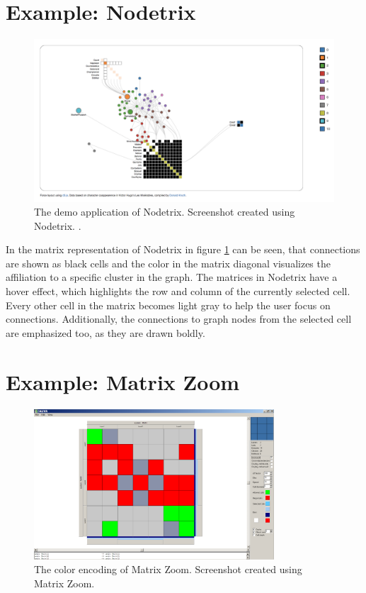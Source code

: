 \section{Example: Nodetrix}


\begin{figure}[H]
\includegraphics[width=\textwidth]{images/nodetrix_cell}
\caption{The demo application of Nodetrix. Screenshot created using Nodetrix. \citep[1302-1309]{henry-nodetrix-2007}.\label{fig:cell_nodetrix}}
\end{figure}



In the matrix representation of Nodetrix in figure \ref{fig:cell_nodetrix} can be seen, that connections are shown as black cells and the color in the matrix diagonal visualizes the affiliation to a specific cluster in the graph. The matrices in Nodetrix have a hover effect, which highlights the row and column of the currently selected cell. Every other cell in the matrix becomes light gray to help the user focus on connections. Additionally, the connections to graph nodes from the selected cell are emphasized too, as they are drawn boldly. \citep[1302-1309]{henry-nodetrix-2007}

\section{Example: Matrix Zoom}

\begin{figure}[H]
\centering
\includegraphics[width=0.8\textwidth]{images/matrixzoom_cell}
\caption{The color encoding of Matrix Zoom. Screenshot created using Matrix Zoom. \citep[227--232]{ham-ivis-2003}\label{fig:zell_matrixzoom}}
\end{figure}

